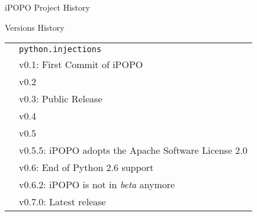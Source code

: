 \begin{frame}{iPOPO Project History}
\begin{block}{Versions History}
\centering
\begin{small}
\begin{table}
\begin{tabular}{@{\,}r <{\hskip 2pt} !{} >{\raggedright\arraybackslash}p{.5\textwidth}}
\addlinespace[1.5ex]
 & \texttt{python.injections} \\
 & v0.1: First Commit of iPOPO \\
 & v0.2 \\
 & v0.3: Public Release \\
 & v0.4 \\
 & v0.5 \\
 & v0.5.5: iPOPO adopts the Apache Software License 2.0 \\
 & v0.6: End of Python 2.6 support \\
 & v0.6.2: iPOPO is not in \textit{beta} anymore \\
 & v0.7.0: Latest release \\
\end{tabular}
\end{table}
\end{small}
\end{block}
\end{frame}
